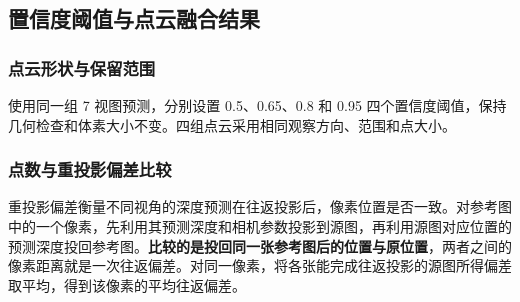 \subsection{置信度阈值与点云融合结果}
\subsubsection{点云形状与保留范围}

使用同一组 7 视图预测，分别设置 0.5、0.65、0.8 和 0.95 四个置信度阈值，保持几何检查和体素大小不变。四组点云采用相同观察方向、范围和点大小。



\subsubsection{点数与重投影偏差比较}

重投影偏差衡量不同视角的深度预测在往返投影后，像素位置是否一致。对参考图中的一个像素，先利用其预测深度和相机参数投影到源图，再利用源图对应位置的预测深度投回参考图。\textbf{比较的是投回同一张参考图后的位置与原位置}，两者之间的像素距离就是一次往返偏差。对同一像素，将各张能完成往返投影的源图所得偏差取平均，得到该像素的平均往返偏差。





